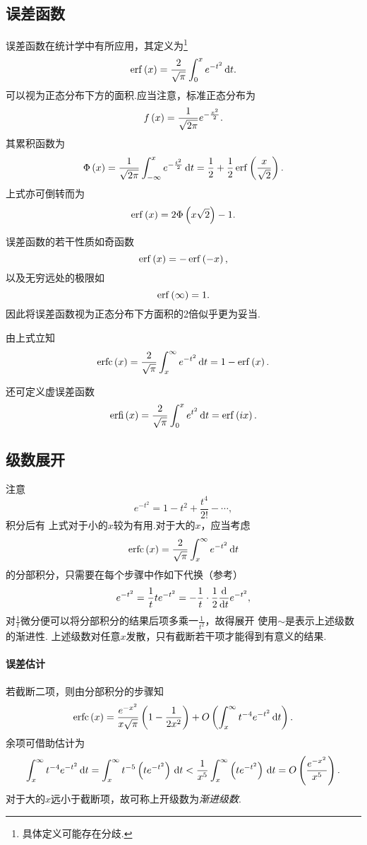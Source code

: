 \documentclass[UTF-8]{ctexart}
\begin{document}
  \subsection{误差函数}
  误差函数在统计学中有所应用，其定义为\footnote{具体定义可能存在分歧.}
  \[ \erf\pare{x} = \frac{2}{\sqrt{\pi}}\intu{x}{e^{-t^2}}{t}. \]
  可以视为正态分布下方的面积.应当注意，标准正态分布为
  \[ f\left(x\right) = \frac{1}{\sqrt{2\pi}} e^{-\frac{x^2}{2}}. \]
  其累积函数为
  \[ \Phi\pare{x} = \frac{1}{\sqrt{2\pi}} \intiu{x}{\ehxs{t}}{t} = \half + \half \erf\pare{\frac{x}{\sqrt{2}}}. \]
  上式亦可倒转而为
  \[ \erf\pare{x} = 2\Phi\pare{x\sqrt{2}}-1. \]
  \par 误差函数的若干性质如奇函数
  \[ \erf\pare{x} = -\erf\pare{-x}, \]
  以及无穷远处的极限如
  \[ \erf\pare{\infty} = 1. \]
  因此将误差函数视为正态分布下方面积的2倍似乎更为妥当.
  \par
  由上式立知
  \[ \erfc\pare{x} = \frac{2}{\sqrt{\pi}} \intbi{x}{e^{-t^2}}{t} = 1-\erf\pare{x}. \]
  \par
  还可定义虚误差函数
  \[ \erfi\pare{x} = \frac{2}{\sqrt{\pi}}\intu{x}{e^{t^2}}{t} = \erf\pare{ix}. \]
  \subsection{级数展开}
  注意\[ e^{-t^2} = 1-t^2+\frac{t^4}{2!}-\cdots, \]
  积分后有
  上式对于小的$x$较为有用.对于大的$x$，应当考虑
  \[ \mathrm{erfc}\left(x\right) = \frac{2}{\sqrt{\pi}}\int_{x}^{\infty} e^{-t^2} \, \mathrm{d} t \]
  的分部积分，只需要在每个步骤中作如下代换（参考）
  \[ e^{-t^2} = \frac{1}{t} t e^{-t^2} = -\frac{1}{t} \cdot \frac{1}{2} \frac{\mathrm{d}}{\mathrm{d} t}{e^{-t^2}}, \]
  对$\frac{1}{t}$微分便可以将分部积分的结果后项多乘一$\frac{1}{t^2}$，故得展开
  使用$\sim$是表示上述级数的渐进性. 上述级数对任意$x$发散，只有截断若干项才能得到有意义的结果.
  \paragraph{误差估计}若截断二项，则由分部积分的步骤知
  \[ \mathrm{erfc}\left(x\right) =  \frac{e^{-x^2}}{x\sqrt{\pi}}\left(1-\frac{1}{2x^2}\right) + O\left(\int_{x}^{\infty} t^{-4}e^{-t^2} \, \mathrm{d} t\right). \]
  余项可借助估计为
  \[ \int_{x}^{\infty} t^{-4}e^{-t^2} \, \mathrm{d} t = \int_{x}^{\infty} t^{-5}\left(te^{-t^2}\right) \, \mathrm{d} t < \frac{1}{x^5}\int_{x}^{\infty} \left(te^{-t^2}\right) \, \mathrm{d} t = O\left(\frac{e^{-x^2}}{x^5}\right). \]
  对于大的$x$远小于截断项，故可称上开级数为\emph{渐进级数}.
\end{document}

